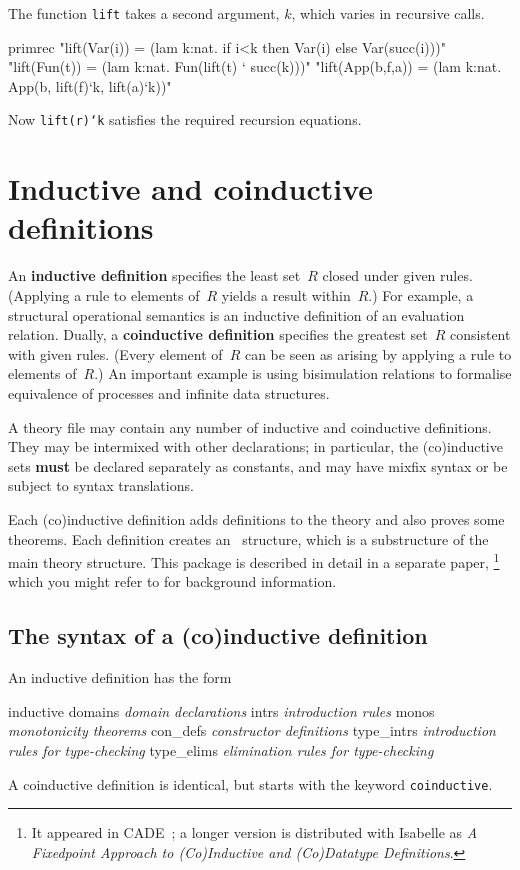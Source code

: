 The function \texttt{lift} takes a second argument, $k$, which varies in
recursive calls.
\begin{ttbox}
primrec
  "lift(Var(i)) = (lam k:nat. if i<k then Var(i) else Var(succ(i)))"
  "lift(Fun(t)) = (lam k:nat. Fun(lift(t) ` succ(k)))"
  "lift(App(b,f,a)) = (lam k:nat. App(b, lift(f)`k, lift(a)`k))"
\end{ttbox}
Now \texttt{lift(r)`k} satisfies the required recursion equations.



\section{Inductive and coinductive definitions}

An {\bf inductive definition} specifies the least set~$R$ closed under given
rules.  (Applying a rule to elements of~$R$ yields a result within~$R$.)  For
example, a structural operational semantics is an inductive definition of an
evaluation relation.  Dually, a {\bf coinductive definition} specifies the
greatest set~$R$ consistent with given rules.  (Every element of~$R$ can be
seen as arising by applying a rule to elements of~$R$.)  An important example
is using bisimulation relations to formalise equivalence of processes and
infinite data structures.

A theory file may contain any number of inductive and coinductive
definitions.  They may be intermixed with other declarations; in
particular, the (co)inductive sets {\bf must} be declared separately as
constants, and may have mixfix syntax or be subject to syntax translations.

Each (co)inductive definition adds definitions to the theory and also
proves some theorems.  Each definition creates an \ML\ structure, which is a
substructure of the main theory structure.
This package is described in detail in a separate paper,%
\footnote{It appeared in CADE~\cite{paulson-CADE}; a longer version is
  distributed with Isabelle as \emph{A Fixedpoint Approach to 
 (Co)Inductive and (Co)Datatype Definitions}.}  %
which you might refer to for background information.


\subsection{The syntax of a (co)inductive definition}
An inductive definition has the form
\begin{ttbox}
inductive
  domains    {\it domain declarations}
  intrs      {\it introduction rules}
  monos      {\it monotonicity theorems}
  con_defs   {\it constructor definitions}
  type_intrs {\it introduction rules for type-checking}
  type_elims {\it elimination rules for type-checking}
\end{ttbox}
A coinductive definition is identical, but starts with the keyword
{\tt coinductive}.  

